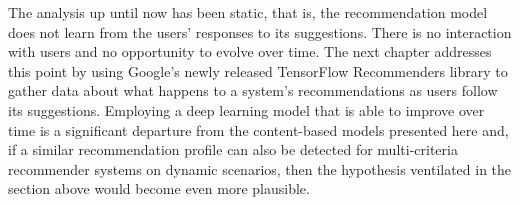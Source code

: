 The analysis up until now has been static, that is, the recommendation model
does not learn from the users' responses to its suggestions. There is no
interaction with users and no opportunity to evolve over time. The next chapter
addresses this point by using Google's newly released TensorFlow Recommenders
library \citep{noauthor_tensorflow_nodate} to gather data about what happens to
a system's recommendations as users follow its suggestions. Employing a deep
learning model that is able to improve over time is a significant departure from
the content-based models presented here and, if a similar recommendation profile
can also be detected for multi-criteria recommender systems on dynamic
scenarios, then the hypothesis ventilated in the section above would become even
more plausible.
